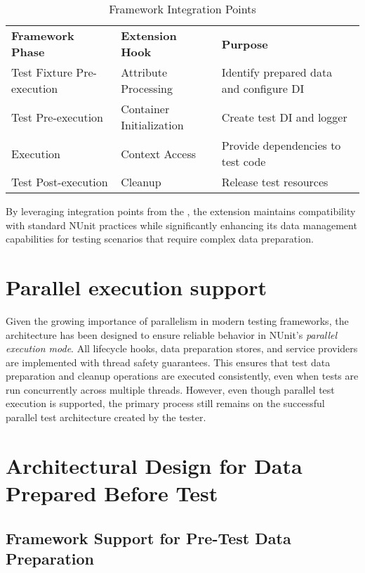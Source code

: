 \begin{table}[h]
    \centering
    \begin{tabular}{lll}
    \textbf{Framework Phase} & \textbf{Extension Hook} & \textbf{Purpose} \\
    Test Fixture Pre-execution  & Attribute Processing & Identify prepared data and configure \ac{DI}  \\
    Test Pre-execution & Container Initialization & Create test \ac{DI} and logger \\
    Execution & Context Access & Provide dependencies to test code \\
    Test Post-execution & Cleanup & Release test resources \\
    \end{tabular}
    \caption{Framework Integration Points}
    \label{tab:fip} %
\end{table}

By leveraging integration points from the , the extension maintains compatibility with standard NUnit practices while significantly enhancing its data management capabilities for testing scenarios that require complex data preparation.

\section{Parallel execution support}
Given the growing importance of parallelism in modern testing frameworks, the architecture has been designed to ensure reliable behavior in NUnit's \textit{parallel execution mode}. All lifecycle hooks, data preparation stores, and service providers are implemented with thread safety guarantees. This ensures that test data preparation and cleanup operations are executed consistently, even when tests are run concurrently across multiple threads. However, even though parallel test execution is supported, the primary process still remains on the successful parallel test architecture created by the tester.


\section{Architectural Design for Data Prepared Before Test}\label{sec:archBefore}

\subsection{Framework Support for Pre-Test Data Preparation}

